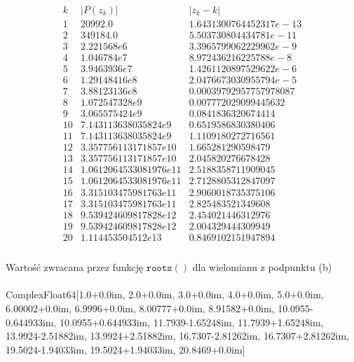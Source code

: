 $$
\begin{array}{c|c|c}
k & |P(z_k)| & |z_k - k|\\
\hline
1 & 20992.0 & 1.6431300764452317e-13\\
2 & 349184.0 & 5.503730804434781e-11\\
3 & 2.221568e6 & 3.3965799062229962e-9\\
4 & 1.046784e7 & 8.972436216225788e-8\\
5 & 3.9463936e7 & 1.4261120897529622e-6\\
6 & 1.29148416e8 & 2.0476673030955794e-5\\
7 & 3.88123136e8 & 0.00039792957757978087\\
8 & 1.072547328e9 & 0.007772029099445632\\
9 & 3.065575424e9 & 0.0841836320674414\\
10 & 7.143113638035824e9 & 0.6519586830380406\\
11 & 7.143113638035824e9 & 1.1109180272716561\\
12 & 3.357756113171857e10 & 1.665281290598479\\
13 & 3.357756113171857e10 & 2.045820276678428\\
14 & 1.0612064533081976e11 & 2.5188358711909045\\
15 & 1.0612064533081976e11 & 2.7128805312847097\\
16 & 3.315103475981763e11 & 2.9060018735375106\\
17 & 3.315103475981763e11 & 2.825483521349608\\
18 & 9.539424609817828e12 & 2.454021446312976\\
19 & 9.539424609817828e12 & 2.004329444309949\\
20 & 1.114453504512e13 & 0.8469102151947894\\
\end{array}
$$
\\
Wartość zwracana przez funkcję $  \mathtt{roots()} $ dla wielomianu z podpunktu (b) \\\\
Complex{Float64}[1.0+0.0im, 2.0+0.0im, 3.0+0.0im, 4.0+0.0im, 5.0+0.0im, 6.00002+0.0im, 6.9996+0.0im, 8.00777+0.0im, 8.91582+0.0im, 10.0955-0.644933im, 10.0955+0.644933im, 11.7939-1.65248im, 11.7939+1.65248im, 13.9924-2.51882im, 13.9924+2.51882im, 16.7307-2.81262im, 16.7307+2.81262im, 19.5024-1.94033im, 19.5024+1.94033im, 20.8469+0.0im]
